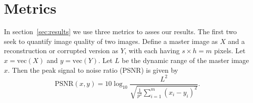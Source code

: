 \documentclass[twocolumn,oneside]{IEEEtran/IEEEtran}
\begin{document}




\section{Metrics}\label{sec:rdi}
In section~\ref{sec:results} we use three metrics to asses our results.
The first two seek to quantify image quality of two images. 
Define a master image as $X$ and a reconstruction or corrupted version as $Y$, with each having $s\times h=m$ pixels.
Let $x=\textrm{vec}(X)$ and $y=\textrm{vec}(Y)$. Let $L$ be the dynamic range of the master image $x$.
Then the peak signal to noise ratio (PSNR) is given by
\begin{equation*}
  \text{PSNR}(x,y) = 10\log_{10}\frac{L^2}
  {\sqrt{\frac{1}{p^2} \sum_{i=1}^{m}( x_{i} - y_{i})^2 }}.
\end{equation*}
\end{document}
